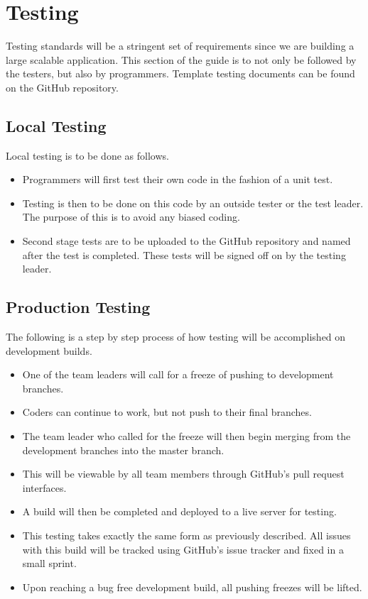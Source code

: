 \documentclass[]{article}
\begin{document}
\section{Testing}
Testing standards will be a stringent set of requirements since we are building a large scalable application. This section of the guide is to not only be followed by the testers, but also by programmers. Template testing documents can be found on the GitHub repository.
\subsection{Local Testing}
Local testing is to be done as follows.
\begin{itemize}
	\item Programmers will first test their own code in the fashion of a unit test.
	\item Testing is then to be done on this code by an outside tester or the test leader. The purpose of this is to avoid any biased coding.
	\item Second stage tests are to be uploaded to the GitHub repository and named after the test is completed. These tests will be signed off on by the testing leader.
\end{itemize}
\subsection{Production Testing}
The following is a step by step process of how testing will be accomplished on development builds.
\begin{itemize}
	\item One of the team leaders will call for a freeze of pushing to development branches. \item Coders can continue to work, but not push to their final branches.
	\item The team leader who called for the freeze will then begin merging from the development branches into the master branch.
	\item This will be viewable by all team members through GitHub's pull request interfaces.
	\item A build will then be completed and deployed to a live server for testing. 
	\item This testing takes exactly the same form as previously described. All issues with this build will be tracked using GitHub's issue tracker and fixed in a small sprint.
	\item Upon reaching a bug free development build, all pushing freezes will be lifted.
\end{itemize}
\end{document}
